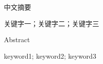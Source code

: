 \begin{abstractCN}

    中文摘要

    \keywordsCN 关键字一；关键字二；关键字三
\end{abstractCN}

\begin{abstractENG}

    Abstract

    \keywordsENG keyword1; keyword2; keyword3
\end{abstractENG}